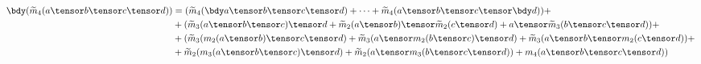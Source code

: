 \documentclass{amsart}
\begin{document}
\thispagestyle{empty}

\newcommand{\tm}{\widetilde{m}}
\newcommand{\ttm}{\widetilde{\widetilde{m}}}

\begin{align*}
\bdy(\tm_4(a \tensor b \tensor c \tensor d)) & = (\tm_4(\bdy a \tensor b \tensor c \tensor d) + \cdots + \tm_4(a \tensor b \tensor c \tensor \bdy d)) + \\
                                             & + (\tm_3(a \tensor b \tensor c) \tensor d + \tm_2(a \tensor b) \tensor \tm_2(c \tensor d) + a \tensor \tm_3(b \tensor c \tensor d)) + \\
                                             & + (\tm_3(m_2(a \tensor b) \tensor c \tensor d) + \tm_3(a \tensor m_2(b \tensor c) \tensor d) + \tm_3(a \tensor b \tensor m_2(c \tensor d)) + \\
                                             & + \tm_2(m_3(a \tensor b \tensor c) \tensor d) + \tm_2(a \tensor m_3(b \tensor c \tensor d)) + m_4(a \tensor b \tensor c \tensor d)) \\
\end{align*}
\end{document}
